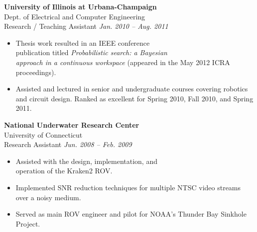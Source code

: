 \documentclass{article}
\begin{document}
{\begin{multicols}{2}
                \textbf{University of Illinois at Urbana-Champaign}\\ 
                Dept. of Electrical and Computer Engineering\\
                Research / Teaching Assistant \hfill \textsl{Jan. 2010 -- Aug. 2011} \\
                \vspace{ -10px}
                \begin{itemize}[noitemsep,nolistsep]
            	 \item Thesis work resulted in an IEEE conference \\publication titled \textsl{Probabilistic search: a Bayesian \\approach in a continuous workspace} (appeared in the May 2012 ICRA proceedings).  
                    \item Assisted and lectured in senior and undergraduate courses covering robotics and circuit design. Ranked as excellent for Spring 2010, Fall 2010, and Spring 2011.
                \end{itemize}
                \vspace{10px}
                \vfill\null
                \columnbreak
                \textbf{National Underwater Research Center}\\ \hfill 
            	University of Connecticut\\ 
            	Research Assistant \hfill \textsl{Jun. 2008 -- Feb. 2009} \\
                \vspace{ -10px}
                \begin{itemize}[noitemsep,nolistsep]
                	\item Assisted with the design, implementation, and \\operation of the Kraken2 ROV.
                	\item Implemented SNR reduction techniques for multiple NTSC video streams over a noisy medium.
                	\item Served as main ROV engineer and pilot for NOAA's Thunder Bay Sinkhole Project. 
                \end{itemize}
                \vspace{5px}

\end{multicols}}
\end{document}
